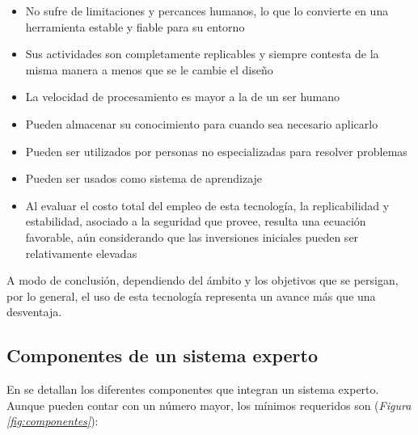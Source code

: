 \begin{itemize}
\item No sufre de limitaciones y percances humanos, lo que lo convierte en una herramienta estable y fiable para su entorno
\item Sus actividades son completamente replicables y siempre contesta de la misma manera a menos que se le cambie el diseño
\item La velocidad de procesamiento es mayor a la de un ser humano
\item Pueden almacenar su conocimiento para cuando sea necesario aplicarlo
\item Pueden ser utilizados por personas no especializadas para resolver problemas
\item Pueden ser usados como sistema de aprendizaje
\item Al evaluar el costo total del empleo de esta tecnología, la replicabilidad y estabilidad, asociado a la seguridad que provee, resulta una ecuación favorable, aún considerando que las inversiones iniciales pueden ser
relativamente elevadas
\end{itemize}

A modo de conclusión, dependiendo del ámbito y los objetivos que se persigan, por lo general, el uso de esta tecnología representa un avance más que una desventaja.

\subsection{Componentes de un sistema experto}
En \cite{Omuya2021} se detallan los diferentes componentes que integran un sistema experto. Aunque pueden contar con un número mayor, los mínimos requeridos son (\textsl{Figura \ref{fig:componentes}}):

